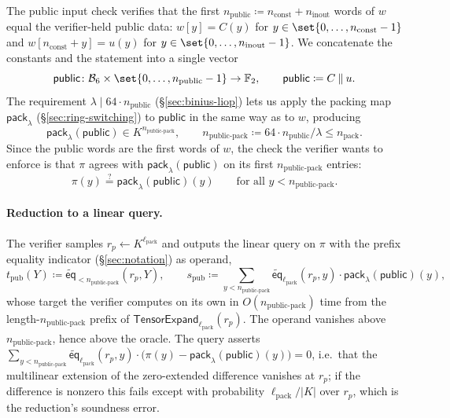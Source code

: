 \documentclass{article}
\theoremstyle{definition}
\newcommand*{\mle}{\widetilde}
\newcommand{\eq}{\mathsf{eq}}
\newcommand{\BB}{\mathcal{B}}
\newcommand{\FF}[1]{\mathbb{F}_{#1}}
\begin{document}
The public input check verifies that the first $n_\text{public} \coloneqq n_\text{const} + n_\text{inout}$ words of $w$ equal the verifier-held public data: $w[y] = C(y)$ for $y \in \set{0, \ldots, n_\text{const} - 1}$ and $w[n_\text{const} + y] = u(y)$ for $y \in \set{0, \ldots, n_\text{inout} - 1}$. We concatenate the constants and the statement into a single vector
\[
  \textsf{public} \colon \BB_6 \times \set{0, \ldots, n_\text{public} - 1} \to \FF{2}, \qquad \textsf{public} \coloneqq C \mathbin{\Vert} u.
\]
The requirement $\lambda \mid 64 \cdot n_\text{public}$ (\S\ref{sec:binius-liop}) lets us apply the packing map $\textsf{pack}_\lambda$ (\S\ref{sec:ring-switching}) to $\textsf{public}$ in the same way as to $w$, producing
\[
  \textsf{pack}_\lambda(\textsf{public}) \in K^{n_\text{public-pack}}, \qquad n_\text{public-pack} \coloneqq 64 \cdot n_\text{public} / \lambda \le n_\text{pack}.
\]
Since the public words are the first words of $w$, the check the verifier wants to enforce is that $\pi$ agrees with $\textsf{pack}_\lambda(\textsf{public})$ on its first $n_\text{public-pack}$ entries:
\[
  \pi(y) \stackrel{?}{=} \textsf{pack}_\lambda(\textsf{public})(y) \qquad \text{for all } y < n_\text{public-pack}.
\]

\paragraph{Reduction to a linear query.}
The verifier samples $r_p \gets K^{\ell_\text{pack}}$ and outputs the linear query on $\pi$ with the prefix equality indicator (\S\ref{sec:notation}) as operand,
\[
  t_\text{pub}(Y) \coloneqq \mle{\eq}_{< n_\text{public-pack}}(r_p, Y), \qquad s_\text{pub} \coloneqq \sum_{y < n_\text{public-pack}} \mle{\eq}_{\ell_\text{pack}}(r_p, y) \cdot \textsf{pack}_\lambda(\textsf{public})(y),
\]
whose target the verifier computes on its own in $O(n_\text{public-pack})$ time from the length-$n_\text{public-pack}$ prefix of $\textsf{TensorExpand}_{\ell_\text{pack}}(r_p)$. The operand vanishes above $n_\text{public-pack}$, hence above the oracle. The query asserts $\sum_{y < n_\text{public-pack}} \mle{\eq}_{\ell_\text{pack}}(r_p, y) \cdot \bigl( \pi(y) - \textsf{pack}_\lambda(\textsf{public})(y) \bigr) = 0$, i.e.\ that the multilinear extension of the zero-extended difference vanishes at $r_p$; if the difference is nonzero this fails except with probability $\ell_\text{pack} / |K|$ over $r_p$, which is the reduction's soundness error.
\end{document}
